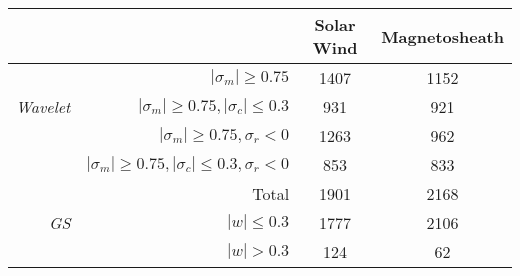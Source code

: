 \begin{tabular}{rrcc}
\hline
& & Solar Wind & Magnetosheath \\
\hline
                  & $|\sigma_m|\geq0.75$                                & 1407 & 1152 \\
\textit{Wavelet}  & $|\sigma_m|\geq0.75, |\sigma_c|\leq0.3$             & 931  & 921  \\
                  & $|\sigma_m|\geq0.75, \sigma_r<0$                    & 1263 & 962  \\
                  & $|\sigma_m|\geq0.75, |\sigma_c|\leq0.3, \sigma_r<0$ & 853  & 833  \\
\hline
                   & Total 		& 1901 & 2168 \\
\textit{GS}        & $|w|\leq 0.3$ & 1777 & 2106 \\
                   & $|w|> 0.3$    & 124  & 62   \\
\hline
\end{tabular}